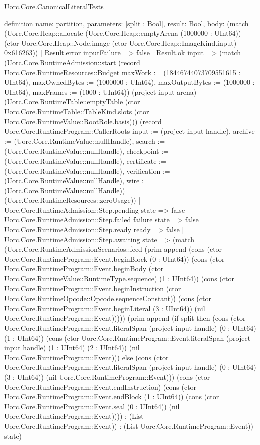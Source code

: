 \begin{lexlean}{Uorc.Core.CanonicalLiteralTests}
\begin{semanticmodule}
definition{
  name: partition,
  parameters: [split : Bool],
  result: Bool,
  body: (match (Uorc.Core.Heap::allocate (Uorc.Core.Heap::emptyArena (1000000 : UInt64)) (ctor Uorc.Core.Heap::Node.image (ctor Uorc.Core.Heap::ImageKind.input) 0x616263))
    | Result.error inputFailure => false
    | Result.ok input => (match (Uorc.Core.RuntimeAdmission::start (record Uorc.Core.RuntimeResources::Budget {maxWork := (18446744073709551615 : UInt64), maxOwnedBytes := (1000000 : UInt64), maxOutputBytes := (1000000 : UInt64), maxFrames := (1000 : UInt64)}) (project input arena) (Uorc.Core.RuntimeTable::emptyTable (ctor Uorc.Core.RuntimeTable::TableKind.slots (ctor Uorc.Core.RuntimeValue::RootRole.basis))) (record Uorc.Core.RuntimeProgram::CallerRoots {input := (project input handle), archive := (Uorc.Core.RuntimeValue::nullHandle), search := (Uorc.Core.RuntimeValue::nullHandle), checkpoint := (Uorc.Core.RuntimeValue::nullHandle), certificate := (Uorc.Core.RuntimeValue::nullHandle), verification := (Uorc.Core.RuntimeValue::nullHandle), wire := (Uorc.Core.RuntimeValue::nullHandle)}) (Uorc.Core.RuntimeResources::zeroUsage))
      | Uorc.Core.RuntimeAdmission::Step.pending state => false
      | Uorc.Core.RuntimeAdmission::Step.failed failure state => false
      | Uorc.Core.RuntimeAdmission::Step.ready ready => false
      | Uorc.Core.RuntimeAdmission::Step.awaiting state => (match (Uorc.Core.RuntimeAdmissionScenarios::feed (prim append (cons (ctor Uorc.Core.RuntimeProgram::Event.beginBlock (0 : UInt64)) (cons (ctor Uorc.Core.RuntimeProgram::Event.beginBody (ctor Uorc.Core.RuntimeValue::RuntimeType.sequence) (1 : UInt64)) (cons (ctor Uorc.Core.RuntimeProgram::Event.beginInstruction (ctor Uorc.Core.RuntimeOpcode::Opcode.sequenceConstant)) (cons (ctor Uorc.Core.RuntimeProgram::Event.beginLiteral (3 : UInt64)) (nil Uorc.Core.RuntimeProgram::Event))))) (prim append (if split then (cons (ctor Uorc.Core.RuntimeProgram::Event.literalSpan (project input handle) (0 : UInt64) (1 : UInt64)) (cons (ctor Uorc.Core.RuntimeProgram::Event.literalSpan (project input handle) (1 : UInt64) (2 : UInt64)) (nil Uorc.Core.RuntimeProgram::Event))) else (cons (ctor Uorc.Core.RuntimeProgram::Event.literalSpan (project input handle) (0 : UInt64) (3 : UInt64)) (nil Uorc.Core.RuntimeProgram::Event))) (cons (ctor Uorc.Core.RuntimeProgram::Event.endInstruction) (cons (ctor Uorc.Core.RuntimeProgram::Event.endBlock (1 : UInt64)) (cons (ctor Uorc.Core.RuntimeProgram::Event.seal (0 : UInt64)) (nil Uorc.Core.RuntimeProgram::Event)))) : (List Uorc.Core.RuntimeProgram::Event)) : (List Uorc.Core.RuntimeProgram::Event)) state)
}
\end{semanticmodule}
\end{lexlean}
